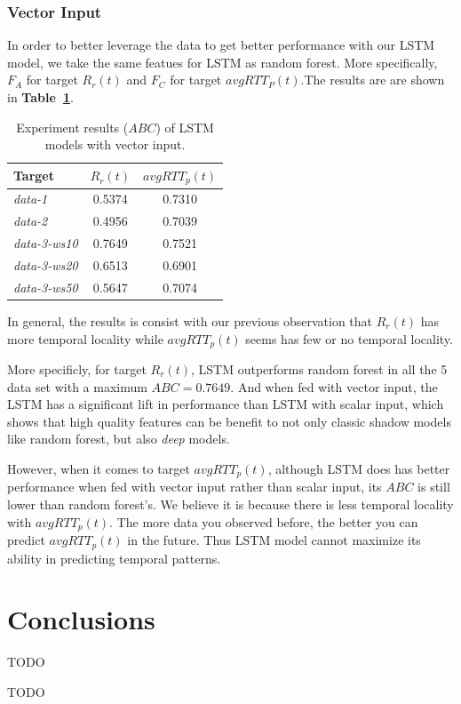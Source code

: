 \documentclass[sigconf]{acmart}
\begin{document}
\subsubsection{Vector Input}
In order to better leverage the data to get better performance with our LSTM model, we take the same featues for LSTM as random forest. More specifically, $F_A$ for target $R_r(t)$ and $F_C$ for target $avgRTT_P(t)$.The results are are shown in \textbf{Table~\ref{tab:lstm-vector}}.
\begin{table}[t]
	\centering
	\begin{tabular}{lcc}
		\toprule
		{Target} &{$R_r(t)$}&{$avgRTT_p(t)$} \\
		\midrule
		\textit{data-1}& 0.5374 & 0.7310 \\
		\textit{data-2}& 0.4956& 0.7039     \\
		\textit{data-3-ws10}& 0.7649 & 0.7521 \\
		\textit{data-3-ws20}& 0.6513& 0.6901    \\
		\textit{data-3-ws50}& 0.5647& 0.7074  \\
		\bottomrule	
	\end{tabular}
	\caption{ Experiment results ($ABC$) of LSTM models with vector input. }
	\label{tab:lstm-vector}
\end{table}

In general, the results is consist with our previous observation that $R_r(t)$ has more temporal locality while $avgRTT_p(t)$ seems has few or no temporal locality.

More specificly, for target $R_r(t)$, LSTM outperforms random forest in all the 5 data set with a maximum $ABC=0.7649$. And when fed with vector input, the LSTM has a significant lift in performance than LSTM with scalar input, which shows that high quality features can be benefit to not only classic shadow models like random forest, but also \textit{deep} models.

However, when it comes to target $avgRTT_p(t)$, although LSTM does has better performance when fed with vector input rather than scalar input, its $ABC$ is still lower than random forest's. We believe it is because there is less temporal locality with $avgRTT_p(t)$. The more data you observed before, the better you can predict $avgRTT_p(t)$ in the future. Thus LSTM model cannot maximize its ability in predicting temporal patterns.
\section{Conclusions}
TODO

\begin{acks}
TODO
\end{acks}




 
\end{document}
